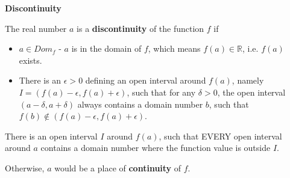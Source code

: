 \documentclass{ximera}
\begin{document}
\begin{definition} \textbf{\textcolor{green!50!black}{Discontinuity}}

The real number $a$ is a \textbf{discontinuity} of the function $f$ if


\begin{itemize}
\item $a \in Dom_f$ - $a$ is in the domain of $f$, which means $f(a) \in \mathbb{R}$, i.e. $f(a)$ exists.
\item There is an $\epsilon > 0$ defining an open interval around $f(a)$, namely $I = (f(a) - \epsilon, f(a) + \epsilon)$, such that for any $\delta > 0$, the open interval $(a - \delta, a + \delta)$ always contains a domain number $b$, such that $f(b) \not\in(f(a)-\epsilon, f(a)+\epsilon)$.
\end{itemize}


There is an open interval $I$ around $f(a)$, such that EVERY open interval around $a$ contains a domain number where the function value is outside $I$.


\end{definition}

Otherwise, $a$ would be a place of \textbf{continuity} of $f$. \\
\end{document}
